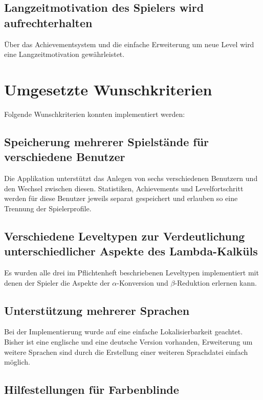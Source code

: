 \subsection{Langzeitmotivation des Spielers wird aufrechterhalten}

Über das Achievementsystem und die einfache Erweiterung um neue Level wird eine Langzeitmotivation gewährleistet.


\section{Umgesetzte Wunschkriterien}

Folgende Wunschkriterien konnten implementiert werden:

\subsection{Speicherung mehrerer Spielstände für verschiedene Benutzer}

Die Applikation unterstützt das Anlegen von sechs verschiedenen Benutzern und den Wechsel zwischen diesen.
Statistiken, Achievements und Levelfortschritt werden für diese Benutzer jeweils separat gespeichert und erlauben so eine Trennung der Spielerprofile.

\subsection{Verschiedene Leveltypen zur Verdeutlichung unterschiedlicher Aspekte des Lambda-Kalküls}

Es wurden alle drei im Pflichtenheft beschriebenen Leveltypen implementiert mit denen der Spieler die Aspekte der \(\alpha\)-Konversion und \(\beta\)-Reduktion erlernen kann.
  
\subsection{Unterstützung mehrerer Sprachen}

Bei der Implementierung wurde auf eine einfache Lokalisierbarkeit geachtet.
Bisher ist eine englische und eine deutsche Version vorhanden, Erweiterung um weitere Sprachen sind durch die Erstellung einer weiteren Sprachdatei einfach möglich.

\subsection{Hilfestellungen für Farbenblinde}

